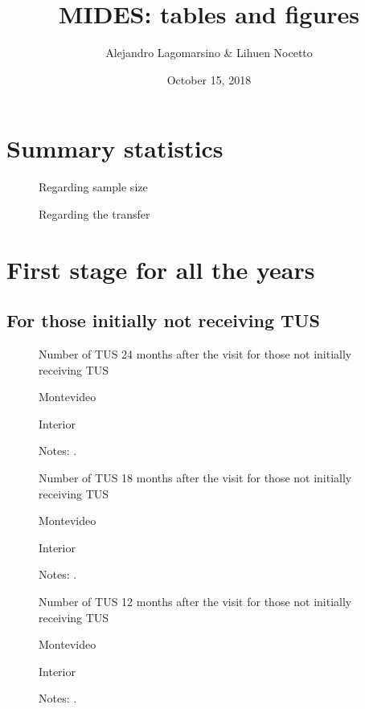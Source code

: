 \documentclass[12pt]{article}
\title{MIDES: tables and figures}
\author{Alejandro Lagomarsino \& Lihuen Nocetto}
\date{October 15, 2018}
\begin{document}
\maketitle	

\section{Summary statistics}
\begin{figure}[H]
\caption{Regarding sample size}

\centering
\label{fig:summStats1}
\end{figure}

\begin{figure}[H]
	\caption{Regarding the transfer}
	
	\centering
	\label{fig:summStats2}
\end{figure}
\section{First stage for all the years}

\subsection{For those initially not receiving TUS}

\begin{figure}[H]%
	\caption{Number of TUS 24 months after the visit for those not initially receiving TUS}%
	\centering
	\caption*{ {Montevideo}}
	\qquad
	\caption*{Interior}
	\label{fig:first_stage_noTus_tus24}%
	\caption*{ {\footnotesize Notes: .}}
\end{figure}

\begin{figure}[H]%
	\caption{Number of TUS 18 months after the visit for those not initially receiving TUS}%
	\centering
	\caption*{ {Montevideo}}
	\qquad
	\caption*{Interior}
	\label{fig:first_stage_noTus_tus18}%
	\caption*{ {\footnotesize Notes: .}}
\end{figure}

\begin{figure}[H]%
	\caption{Number of TUS 12 months after the visit for those not initially receiving TUS}%
	\centering
	\caption*{ {Montevideo}}
	\qquad
	\caption*{Interior}
	\label{fig:first_stage_noTus_tus12}%
	\caption*{ {\footnotesize Notes: .}}
\end{figure}
\end{document}
